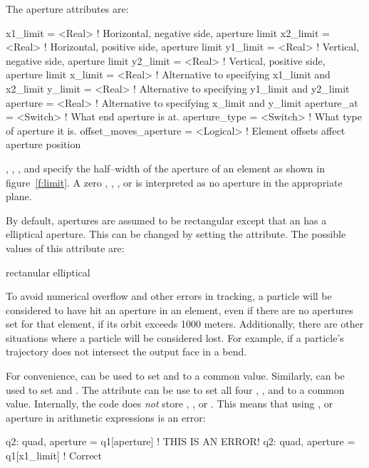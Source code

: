 The aperture attributes are:
\begin{example}
  x1_limit      = <Real>      ! Horizontal, negative side, aperture limit
  x2_limit      = <Real>      ! Horizontal, positive side, aperture limit
  y1_limit      = <Real>      ! Vertical, negative side, aperture limit
  y2_limit      = <Real>      ! Vertical, positive side, aperture limit
  x_limit       = <Real>      ! Alternative to specifying x1_limit and x2_limit
  y_limit       = <Real>      ! Alternative to specifying y1_limit and y2_limit
  aperture      = <Real>      ! Alternative to specifying x_limit and y_limit
  aperture_at   = <Switch>    ! What end aperture is at.
  aperture_type = <Switch>    ! What type of aperture it is.
  offset_moves_aperture = <Logical> ! Element offsets affect aperture position
\end{example}
, , , and  specify
the half--width of the aperture of an element as shown in
figure~\ref{f:limit}. A zero , ,
, or  is interpreted as no aperture in the
appropriate plane.

By default, apertures are assumed to be
rectangular except that an  has a elliptical aperture.
This can be changed by setting the  attribute. The possible 
values of this attribute are:
\begin{example}
  rectanular
  elliptical
\end{example}

To avoid numerical overflow and other errors in tracking, a particle
will be considered to have hit an aperture in an element, even if
there are no apertures set for that element, if its orbit exceeds 1000
meters. Additionally, there are other situations where a particle will
be considered lost. For example, if a particle's trajectory does
not intersect the output face in a bend.

For convenience,  can be used to set  and
 to a common value. Similarly,  can be used
to set  and .  The  attribute
can be use to set all four , , 
and  to a common value. Internally, the \bmad code does {\em not}
store , , or . This means that
using ,  or aperture in arithmetic expressions is
an error:
\begin{example}
  q2: quad, aperture = q1[aperture]   ! THIS IS AN ERROR!
  q2: quad, aperture = q1[x1_limit]   ! Correct
\end{example}

